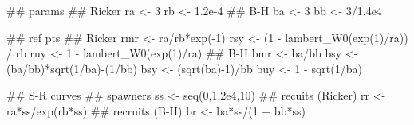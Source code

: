 \documentclass[
  11pt,
]{article}
\newenvironment{Shaded}{}{}
\newcommand{\DecValTok}[1]{#1}
\newcommand{\DocumentationTok}[1]{\textcolor[rgb]{0.00,0.50,0.00}{#1}}
\newcommand{\FloatTok}[1]{#1}
\newcommand{\FunctionTok}[1]{#1}
\newcommand{\NormalTok}[1]{#1}
\newcommand{\OtherTok}[1]{\textcolor[rgb]{1.00,0.25,0.00}{#1}}
\newcommand{\SpecialCharTok}[1]{\textcolor[rgb]{0.00,0.50,0.50}{#1}}
\begin{document}
\begin{Shaded}
\begin{Highlighting}[]
\DocumentationTok{\#\# params}
\DocumentationTok{\#\# Ricker}
\NormalTok{ra }\OtherTok{\textless{}{-}} \DecValTok{3}
\NormalTok{rb }\OtherTok{\textless{}{-}} \FloatTok{1.2e{-}4}
\DocumentationTok{\#\# B{-}H}
\NormalTok{ba }\OtherTok{\textless{}{-}} \DecValTok{3}
\NormalTok{bb }\OtherTok{\textless{}{-}} \DecValTok{3}\SpecialCharTok{/}\FloatTok{1.4e4}

\DocumentationTok{\#\# ref pts}
\DocumentationTok{\#\# Ricker}
\NormalTok{rmr }\OtherTok{\textless{}{-}}\NormalTok{ ra}\SpecialCharTok{/}\NormalTok{rb}\SpecialCharTok{*}\FunctionTok{exp}\NormalTok{(}\SpecialCharTok{{-}}\DecValTok{1}\NormalTok{)}
\NormalTok{rsy }\OtherTok{\textless{}{-}}\NormalTok{ (}\DecValTok{1} \SpecialCharTok{{-}} \FunctionTok{lambert\_W0}\NormalTok{(}\FunctionTok{exp}\NormalTok{(}\DecValTok{1}\NormalTok{)}\SpecialCharTok{/}\NormalTok{ra)) }\SpecialCharTok{/}\NormalTok{ rb}
\NormalTok{ruy }\OtherTok{\textless{}{-}} \DecValTok{1} \SpecialCharTok{{-}} \FunctionTok{lambert\_W0}\NormalTok{(}\FunctionTok{exp}\NormalTok{(}\DecValTok{1}\NormalTok{)}\SpecialCharTok{/}\NormalTok{ra)}
\DocumentationTok{\#\# B{-}H}
\NormalTok{bmr }\OtherTok{\textless{}{-}}\NormalTok{ ba}\SpecialCharTok{/}\NormalTok{bb}
\NormalTok{bsy }\OtherTok{\textless{}{-}}\NormalTok{ (ba}\SpecialCharTok{/}\NormalTok{bb)}\SpecialCharTok{*}\FunctionTok{sqrt}\NormalTok{(}\DecValTok{1}\SpecialCharTok{/}\NormalTok{ba)}\SpecialCharTok{{-}}\NormalTok{(}\DecValTok{1}\SpecialCharTok{/}\NormalTok{bb)}
\NormalTok{bsy }\OtherTok{\textless{}{-}}\NormalTok{ (}\FunctionTok{sqrt}\NormalTok{(ba)}\SpecialCharTok{{-}}\DecValTok{1}\NormalTok{)}\SpecialCharTok{/}\NormalTok{bb}
\NormalTok{buy }\OtherTok{\textless{}{-}} \DecValTok{1} \SpecialCharTok{{-}} \FunctionTok{sqrt}\NormalTok{(}\DecValTok{1}\SpecialCharTok{/}\NormalTok{ba)}

\DocumentationTok{\#\# S{-}R curves}
\DocumentationTok{\#\# spawners}
\NormalTok{ss }\OtherTok{\textless{}{-}} \FunctionTok{seq}\NormalTok{(}\DecValTok{0}\NormalTok{,}\FloatTok{1.2e4}\NormalTok{,}\DecValTok{10}\NormalTok{)}
\DocumentationTok{\#\# recuits (Ricker)}
\NormalTok{rr }\OtherTok{\textless{}{-}}\NormalTok{ ra}\SpecialCharTok{*}\NormalTok{ss}\SpecialCharTok{/}\FunctionTok{exp}\NormalTok{(rb}\SpecialCharTok{*}\NormalTok{ss)}
\DocumentationTok{\#\# recruits (B{-}H)}
\NormalTok{br }\OtherTok{\textless{}{-}}\NormalTok{ ba}\SpecialCharTok{*}\NormalTok{ss}\SpecialCharTok{/}\NormalTok{(}\DecValTok{1} \SpecialCharTok{+}\NormalTok{ bb}\SpecialCharTok{*}\NormalTok{ss)}
\end{Highlighting}
\end{Shaded}
\end{document}
